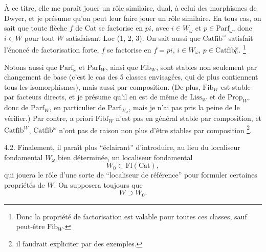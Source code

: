 \documentclass[11pt]{article}
\newcommand{\printedpage}[1]{\marginpar{\footnotesize p.~#1}}
\newcommand{\msp}[1]{\marginpar{\footnotesize [#1]}}
\newcommand{\Cat}{\mathrm{Cat}}
\newcommand{\Fib}{\mathrm{Fib}}
\newcommand{\Fibf}{\mathrm{Fibf}}
\newcommand{\Parf}{\mathrm{Parf}}
\newcommand{\Catfib}{\mathrm{Catfib}}
\begin{document}
À ce titre, elle me paraît jouer un rôle similaire, dual, à celui des morphismes de Dwyer, et je présume qu'on peut leur faire jouer un rôle similaire. En tous \msp{page 29} cas, on sait que toute flèche $f$ de Cat se factorise en $pi$, avec $i \in W_\omega$ et $p \in \Parf_\omega$, donc $i \in W$ pour tout $W$ satisfaisant Loc (1, 2, 3). On sait aussi que $\Catfib^\omega$ satisfait l'énoncé de factorisation forte, $f$ se factorise en $f = pi$, $i \in W_\omega$, $p \in \Catfib_0^\omega$. \footnote[21]{Donc la propriété de factorisation est valable pour toutes ces classes, sauf peut-être $\Fib_W$.}

Notons aussi que $\Parf_\omega$ et $\Parf_W$, ainsi que $\Fib_W$, sont stables non seulement par changement de base (c'est le cas des 5 classes envisagées, qui de plus contiennent tous les isomorphismes), mais aussi par composition. (De plus, $\Fib_W$ est stable par facteurs directs, et je présume qu'il en est de même de $\mathrm{Liss}_W$ et de $\mathrm{Prop}_W$, donc de $\Parf_W$, en particulier de $\Parf_{W_\omega}$, mais je n'ai pas pris la peine de le vérifier.) Par contre, a priori $\Fibf_W$ n'est pas en général stable par composition, et $\Catfib^W$, $\Catfib^\omega$ n'ont pas de raison
\printedpage{20}
non plus d'être stables par composition \footnote[22]{il faudrait expliciter par des exemples.}.

4.2. Finalement, il paraît plus “éclairant” d'introduire, au lieu du localiseur fondamental $W_\omega$ bien déterminée, un localiseur fondamental %
\[
W_0 \subset \mathrm{Fl}(\Cat),
\]
qui jouera le rôle d'une sorte de “localiseur de référence” pour formuler certaines propriétés de $W$. On supposera toujours que
\[
W \supset W_0.
\]

\msp{page 30}
\end{document}
